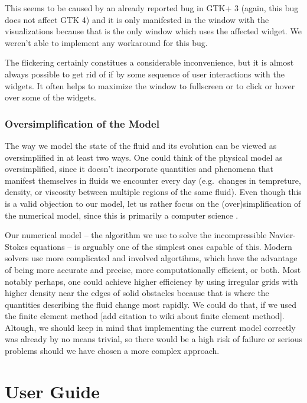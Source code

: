 \documentclass[11pt,a4paper,twoside,openright]{report}
\begin{document}
This seems to be caused by an already reported bug in GTK+ 3 (again, this bug does not affect GTK 4) and it is only manifested in the window with the visualizations because that is the only window which uses the affected  widget. We weren't able to implement any workaround for this bug.

The flickering certainly constitues a considerable inconvenience, but it is almost always possible to get rid of if by some sequence of user interactions with the widgets. It often helps to maximize the window to fullscreen or to click or hover over some of the widgets.

\subsection{Oversimplification of the Model}
The way we model the state of the fluid and its evolution can be viewed as oversimplified in at least two ways. One could think of the physical model as oversimplified, since it doesn't incorporate quantities and phenomena that manifest themselves in fluids we encounter every day (e.g.\ changes in tempreture, density, or viscosity between multiple regions of the same fluid). Even though this is a valid objection to our model, let us rather focus on the (over)simplification of the numerical model, since this \this{} is primarily a computer science \this{}.

Our numerical model -- the algorithm we use to solve the incompressible Navier-Stokes equations -- is arguably one of the simplest ones capable of this. Modern solvers use more complicated and involved algortihms, which have the advantage of being more accurate and precise, more computationally efficient, or both. Most notably perhaps, one could achieve higher efficiency by using irregular grids with higher density near the edges of solid obstacles because that is where the quantities describing the fluid change most rapidly. We could do that, if we used the finite element method [add citation to wiki about finite element method]. Altough, we should keep in mind that implementing the current model correctly was already by no means trivial, so there would be a high risk of failure or serious problems should we have chosen a more complex approach.


\chapter{User Guide}
\end{document}
